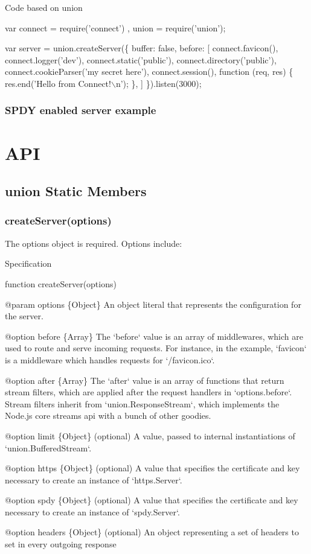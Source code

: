 Code based on union


\begin{DoxyCode}
var connect = require('connect')
  , union = require('union');

var server = union.createServer(\{
  buffer: false,
  before: [
    connect.favicon(),
    connect.logger('dev'),
    connect.static('public'),
    connect.directory('public'),
    connect.cookieParser('my secret here'),
    connect.session(),
    function (req, res) \{
      res.end('Hello from Connect!\(\backslash\)n');
    \},
  ]
\}).listen(3000);
\end{DoxyCode}


\subsubsection*{S\+P\+DY enabled server example}

\section*{A\+PI}

\subsection*{union Static Members}

\subsubsection*{create\+Server(options)}

The {\ttfamily options} object is required. Options include\+:

Specification


\begin{DoxyCode}
function createServer(options)

@param options \{Object\}
An object literal that represents the configuration for the server.

  @option before \{Array\}
  The `before` value is an array of middlewares, which are used to route and serve incoming
  requests. For instance, in the example, `favicon` is a middleware which handles requests
  for `/favicon.ico`.

  @option after \{Array\}
  The `after` value is an array of functions that return stream filters,
  which are applied after the request handlers in `options.before`.
  Stream filters inherit from `union.ResponseStream`, which implements the
  Node.js core streams api with a bunch of other goodies.

  @option limit \{Object\}
  (optional) A value, passed to internal instantiations of `union.BufferedStream`.

  @option https \{Object\}
  (optional) A value that specifies the certificate and key necessary to create an instance of
  `https.Server`.

  @option spdy \{Object\}
  (optional) A value that specifies the certificate and key necessary to create an instance of
  `spdy.Server`.

  @option headers \{Object\}
  (optional) An object representing a set of headers to set in every outgoing response
\end{DoxyCode}


